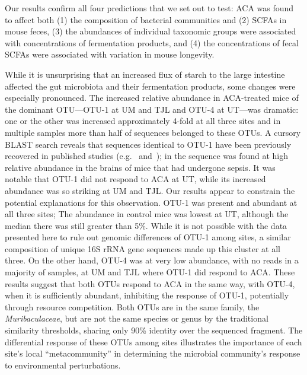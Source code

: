 \documentclass{doc/template/bmcart-nofigbox}
\newcommand{\frnlang}[1]{\textit{#1}}
\newcommand{\taxon}[1]{\frnlang{#1}}
\begin{document}
Our results confirm all four predictions that we set out to test:
ACA was found to affect both (1) the composition of bacterial communities and
(2) SCFAs in mouse feces,
(3) the abundances of individual taxonomic groups were associated with
concentrations of fermentation products,
and (4) the concentrations of fecal SCFAs were associated with variation in
mouse longevity.

While it is unsurprising that an increased flux of starch to the large
intestine affected the gut microbiota and their fermentation products,
some changes were especially pronounced.
The increased relative abundance in ACA-treated mice of the dominant
OTU---OTU-1 at UM and TJL and OTU-4 at UT---was
dramatic:
one or the other was increased approximately 4-fold at all three sites
and in multiple samples more than half of sequences belonged to these OTUs.
A cursory BLAST search reveals that sequences identical to OTU-1 have been
previously recovered in published studies (e.g.~\cite{Lowe2017} and~\cite{Castoldi2017});
in \cite{Singer2017} the sequence was found at high relative
abundance in the brains of mice that had undergone sepsis.
It was notable that OTU-1 did not respond to ACA at UT, while its increased
abundance was so striking at UM and TJL\@.
Our results appear to constrain the potential explanations for this
observation.
OTU-1 was present and abundant at all three sites;
The abundance in control mice was lowest at UT, although the median there was
still greater than 5\%.
While it is not possible with the data presented here to rule out genomic
differences of OTU-1 among sites, a similar composition of unique
16S rRNA gene sequences made up this cluster at all three.
On the other hand, OTU-4 was at very low abundance, with no reads in a majority
of samples, at UM and TJL where OTU-1 did respond to ACA\@.
These results suggest that both OTUs respond to ACA in the same way,
with OTU-4, when it is sufficiently abundant, inhibiting the response of OTU-1,
potentially through resource competition.
Both OTUs are in the same family, the \taxon{Muribaculaceae}, but are not the same
species or genus by the traditional similarity thresholds, sharing only 90\%
identity over the sequenced fragment.
The differential response of these OTUs among sites illustrates the
importance of each site's local ``metacommunity'' in determining the microbial
community's response to environmental perturbations.
\end{document}
